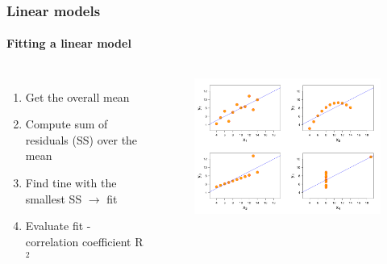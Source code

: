 \documentclass[aspectratio=43]{beamer}
\begin{document}
\begin{frame}
	
	\frametitle{Linear models}
	\framesubtitle{Fitting a linear model}
	
	\footnotesize
	
	\begin{columns}
		
		
		\begin{enumerate}
			\item Get the overall mean
			\item Compute sum of residuals (SS) over the mean
			\item Find tine with the smallest SS $\rightarrow$ fit
			\item Evaluate fit  - correlation coefficient R$^{2}$
		\end{enumerate}
		
		
		\begin{figure}[!htb]
			\includegraphics[width = \linewidth]{plots/part2/linear_model.png}
		\end{figure}
		
	\end{columns}

\end{frame}
\end{document}
